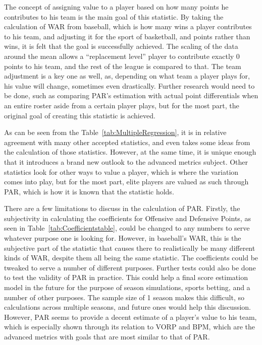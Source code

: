 \documentclass[titlepage, 12pt]{article}
\begin{document}
The concept of assigning value to a player based on how many points he 
contributes to his team is the main goal of this statistic. By taking the 
calculation of WAR from baseball, which is how many wins a player 
contributes to his team, and adjusting it for the sport of basketball, and 
points rather than wins, it is felt that the goal is successfully achieved. The 
scaling of the data around the mean allows a ``replacement level'' player 
to contribute exactly 0 points to his team, and the rest of the league is 
compared to that. The team adjustment is a key one as well, as, 
depending on what team a player plays for, his value will change, 
sometimes even drastically. Further research would need to be done, 
such as comparing PAR's estimation with actual point differentials when 
an entire roster aside from a certain player plays, but for the most part, 
the original goal of creating this statistic is achieved.

As can be seen from the 
Table~\ref{tab:MultipleRegression}, it is in relative agreement with many 
other accepted statistics, and even takes some ideas from the calculation 
of those statistics. However, at the same time, it is unique enough that it 
introduces a brand new outlook to the advanced metrics subject. Other 
statistics look for other ways to value a player, which is where the 
variation comes into play, but for the most part, elite players are valued as 
such through PAR, which is how it is known that the statistic holds.

There are a few limitations to discuss in the calculation of PAR. Firstly, the 
subjectivity in calculating the coefficients for Offensive and Defensive 
Points, as seen in Table~\ref{tab:Coefficientstable}, could be changed to 
any numbers to serve whatever purpose one is looking for. However, in 
baseball's WAR, this is the subjective part of the statistic that causes 
there to realistically be many different kinds of WAR, despite them all 
being the same statistic. The coefficients could be tweaked to serve a 
number of different purposes. Further tests could also be done to test the 
validity of PAR in practice. This could help a final score estimation model 
in the future for the purpose of season simulations, sports betting, and a 
number of other purposes. The sample size of 1 season makes this 
difficult, so calculations across multiple seasons, and future ones would 
help this discussion. However, PAR seems to provide a decent estimate of 
a player's value to his team, which is especially shown through its relation 
to VORP and BPM, which are the advanced metrics with goals that are 
most similar to that of PAR.
\end{document}
